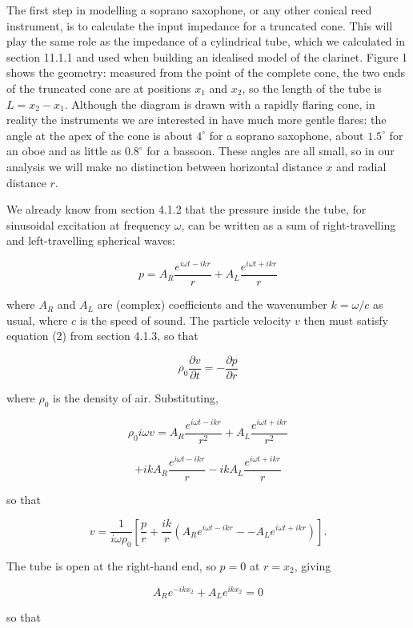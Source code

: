   The first step in modelling a soprano saxophone, or any other conical reed 
  instrument, is to calculate the input impedance for a truncated cone. This 
  will play the same role as the impedance of a cylindrical tube, which we 
  calculated in section 11.1.1 and used when building an idealised model of the 
  clarinet. Figure 1 shows the geometry: measured from the point of the 
  complete cone, the two ends of the truncated cone are at positions $x_1$ and 
  $x_2$, so the length of the tube is $L=x_2-x_1$. Although the diagram is 
  drawn with a rapidly flaring cone, in reality the instruments we are 
  interested in have much more gentle flares: the angle at the apex of the cone 
  is about $4^\circ$ for a soprano saxophone, about $1.5^\circ$ for an oboe and 
  as little as $0.8^\circ$ for a bassoon. These angles are all small, so in our 
  analysis we will make no distinction between horizontal distance $x$ and 
  radial distance $r$. 

  We already know from section 4.1.2 that the pressure inside the tube, for 
  sinusoidal excitation at frequency $\omega$, can be written as a sum of 
  right-travelling and left-travelling spherical waves: 

  $$p=A_R \dfrac{e^{i \omega t -ikr}}{r} + A_L \dfrac{e^{i \omega t +ikr}}{r} 
  \tag{1}$$ 

  where $A_R$ and $A_L$ are (complex) coefficients and the wavenumber 
  $k=\omega/c$ as usual, where $c$ is the speed of sound. The particle velocity 
  $v$ then must satisfy equation (2) from section 4.1.3, so that 

  $$\rho_0\dfrac{\partial v}{\partial t}=-\dfrac{\partial p}{\partial r} 
  \tag{2}$$ 

  where $\rho_0$ is the density of air. Substituting, 

  $$\rho_0 i \omega v = A_R \dfrac{e^{i \omega t -ikr}}{r^2} + A_L \dfrac{e^{i 
  \omega t +ikr}}{r^2}$$ 

  $$+ ik A_R\dfrac{e^{i \omega t -ikr}}{r}- ik A_L\dfrac{e^{i \omega t 
  +ikr}}{r} \tag{3}$$ 

  so that 

  $$v=\dfrac{1}{i \omega \rho_0}\left[ \dfrac{p}{r}+\dfrac{ik}{r}\left(A_R e^{i 
  \omega t -ikr} -- A_L e^{i \omega t +ikr} \right) \right] . \tag{4}$$ 

  The tube is open at the right-hand end, so $p=0$ at $r=x_2$, giving 

  $$A_R e^{-ikx_2} + A_L e^{ikx_2} = 0 \tag{5}$$ 

  so that 

